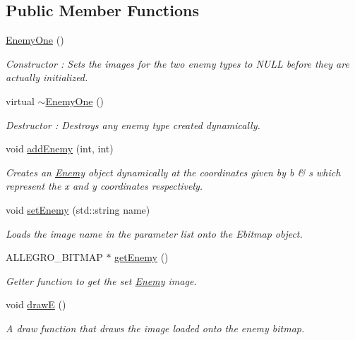 \subsection*{Public Member Functions}
\begin{DoxyCompactItemize}
\item 
\hyperlink{classEnemyOne_a876b7dc33899c1627a0ee1e08b34baf8}{EnemyOne} ()
\begin{DoxyCompactList}\small\item\em Constructor : Sets the images for the two enemy types to NULL before they are actually initialized. \item\end{DoxyCompactList}\item 
virtual \hyperlink{classEnemyOne_ad7999ae2c8228030d3f07df562a5aa0a}{$\sim$EnemyOne} ()
\begin{DoxyCompactList}\small\item\em Destructor : Destroys any enemy type created dynamically. \item\end{DoxyCompactList}\item 
void \hyperlink{classEnemyOne_a428e216932e0a454b59b705f62d1c1a0}{addEnemy} (int, int)
\begin{DoxyCompactList}\small\item\em Creates an \hyperlink{classEnemy}{Enemy} object dynamically at the coordinates given by b \& s which represent the x and y coordinates respectively. \item\end{DoxyCompactList}\item 
void \hyperlink{classEnemyOne_a53c380bf26465df0f0f7beaca93b952d}{setEnemy} (std::string name)
\begin{DoxyCompactList}\small\item\em Loads the image name in the parameter list onto the Ebitmap object. \item\end{DoxyCompactList}\item 
ALLEGRO\_\-BITMAP $\ast$ \hyperlink{classEnemyOne_a348b86c31e258c7ccf83a4f44397f542}{getEnemy} ()
\begin{DoxyCompactList}\small\item\em Getter function to get the set \hyperlink{classEnemy}{Enemy} image. \item\end{DoxyCompactList}\item 
void \hyperlink{classEnemyOne_a8017eb7f3cf8510043e542ed5314fbf9}{drawE} ()
\begin{DoxyCompactList}\small\item\em A draw function that draws the image loaded onto the enemy bitmap. \item\end{DoxyCompactList}\end{DoxyCompactItemize}
